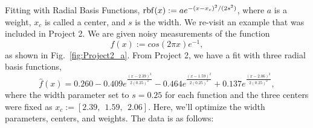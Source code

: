 
\begin{example} Fitting with Radial Basis Functions, ${\rm rbf}(x):=a e^{-(x-x_c)^2 / (2s^2)}$, where $a$ is a weight, $x_c$ is called a center, and $s$ is the width. We re-visit an example that was included in Project 2. We are given noisy measurements of the function
\begin{equation}
    f(x) :=cos(2 \pi x) e^{-1},
\end{equation}
as shown in Fig.~\ref{fig:Project2_a}. From Project 2, we have a fit with three radial basis functions,
$$ \hat{f}(x) = 0.260 -0.409e^{ \frac{(x-2.39)^2}{2 (0.25)^2} } - 0.464e^{ \frac{(x-1.59)^2}{2 (0.25)^2} } + 0.137 e^{ \frac{(x-2.06)^2}{2 (0.25)^2} }, $$
where the width parameter set to $s = 0.25$ for each function and the three centers were fixed as
$x_c := [2.39,~~1.59,~~ 2.06]$. Here, we'll optimize the width parameters, centers, and weights. The data is as follows:


\end{example}
